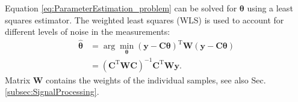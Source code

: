 Equation \eqref{eq:ParameterEstimation_problem} can be solved for $\boldsymbol{\theta}$ using a least squares estimator. The weighted least squares (WLS)  \cite{Gautier.2013,M.Gautier.1995,V.Bargsten.2013,Swevers.1997} is used to account for different levels of noise in the measurements: 
\begin{equation} \label{eq:ParameterEstimation_WLS}
    \begin{aligned}
	    \hat{\boldsymbol{\theta}} &= \arg \min_{{\boldsymbol{\theta}}} (\boldsymbol{y} - \boldsymbol{C} \boldsymbol{\theta})^\mathrm{T} \boldsymbol{W} (\boldsymbol{y} - \boldsymbol{C} \boldsymbol{\theta}) \\
	    &= (\boldsymbol{C}^\mathrm{T} \boldsymbol{W} \boldsymbol{C})^{-1} \boldsymbol{C}^\mathrm{T} \boldsymbol{W} \boldsymbol{y}.
	\end{aligned}
\end{equation}
Matrix $\boldsymbol{W}$ contains the weights of the individual samples, see also Sec.\,\ref{subsec:SignalProcessing}.
